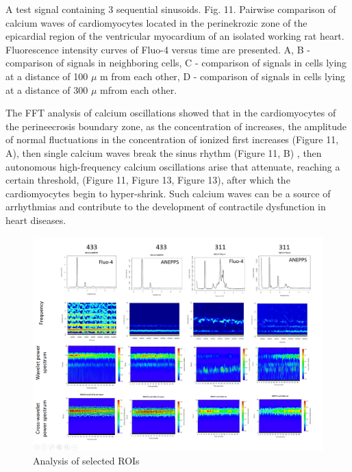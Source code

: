 \documentclass{biophys-new}
\begin{document}
A test signal containing 3 sequential sinusoids.
Fig. 11. Pairwise comparison of calcium waves of cardiomyocytes located in the perinekrozic zone of the epicardial region of the ventricular myocardium of an isolated working rat heart. Fluorescence intensity curves of Fluo-4 versus time are presented. A, B - comparison of signals in neighboring cells, C - comparison of signals in cells lying at a distance of 100 $\mu$ m from each other, D - comparison of signals in cells lying at a distance of 300 $\mu$  mfrom each other.


The FFT analysis of calcium oscillations showed that in the cardiomyocytes of the perineecrosis boundary zone, as the concentration of  increases, the amplitude of normal fluctuations in the concentration of ionized  first increases (Figure 11, A), then single calcium waves break the sinus rhythm (Figure 11, B) , then autonomous high-frequency calcium oscillations arise that attenuate, reaching a certain threshold, (Figure 11, Figure 13, Figure 13), after which the cardiomyocytes begin to hyper-shrink. Such calcium waves can be a source of arrhythmias and contribute to the development of contractile dysfunction in heart diseases.


\begin{figure}[hbt!]
\centering
\includegraphics[width=0.9\linewidth]{fig9.png}
\caption{ Analysis of selected ROIs }
\label{fig:fig9}
\end{figure}
\end{document}
